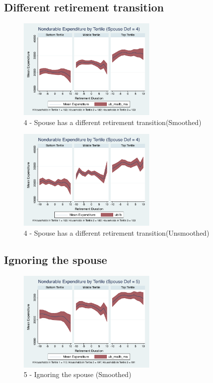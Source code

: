 \documentclass[11pt,onecolumn]{article}
\begin{document}
\subsection{Different retirement transition}
\begin{figure}[h]
	\caption{4 - Spouse has a different retirement transition(Smoothed)}
	\centering
	\includegraphics[width=0.6\textwidth]{../ConsumptionPostRetirement_by_SpouseDef/Smoothed/spouse_def_4.pdf}
\end{figure}

\begin{figure}[h]
	\caption{4 - Spouse has a different retirement transition(Unsmoothed)}
	\centering
	\includegraphics[width=0.6\textwidth]{../ConsumptionPostRetirement_by_SpouseDef/UnSmoothed/spouse_def_4.pdf}
\end{figure}
\clearpage


\subsection{Ignoring the spouse}

\begin{figure}[h]
	\caption{5 - Ignoring the spouse (Smoothed)}
	\centering
	\includegraphics[width=0.6\textwidth]{../ConsumptionPostRetirement_by_SpouseDef/Smoothed/spouse_def_5.pdf}
\end{figure}
\end{document}
